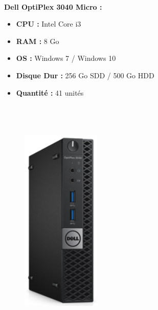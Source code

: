 \documentclass[11pt,a4paper,twoside]{article}
\begin{document}
\paragraph{}\textbf{Dell OptiPlex 3040 Micro :} \\
\begin{itemize}
\item \textbf{CPU :} Intel Core i3
\item \textbf{RAM :} 8 Go
\item \textbf{OS :} Windows 7 / Windows 10
\item \textbf{Disque Dur :} 256 Go SDD / 500 Go HDD
\item \textbf{Quantité :} 41 unités
\\ \\ \\ \\
\end{itemize}
\begin{figure}
\includegraphics[scale=0.4]{Ressources/Materiel/3040.png}\vspace{-2cm}
\end{figure}
\end{document}
